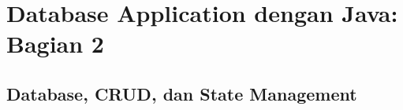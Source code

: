 \chapter{Database Application dengan Java: Bagian 2}

\section{Database, CRUD, dan State Management}